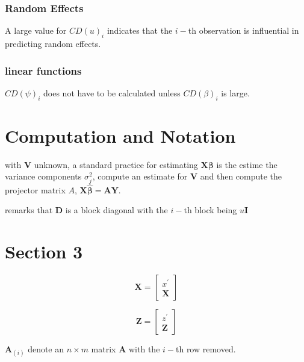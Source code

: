 \documentclass[12pt, a4paper]{article}
\begin{document}
\subsubsection{Random Effects}


A large value for $CD(u)_i$ indicates that the $i-$th observation is influential in predicting random effects.


\subsubsection{linear functions}


$CD(\psi)_i$ does not have to be calculated unless $CD(\beta)_i$ is large.



\section{Computation and Notation } %
with $\boldsymbol{V}$ unknown, a standard practice for estimating $\boldsymbol{X \beta}$ is the estime the variance components $\sigma^2_j$,
compute an estimate for $\boldsymbol{V}$ and then compute the projector matrix $A$, $\boldsymbol{X \hat{\beta}}  = \boldsymbol{AY}$.


\citet{tewomir} remarks that $\boldsymbol{D}$ is a block diagonal with the $i-$th block being $u \boldsymbol{I}$




\section{Section 3}

\[  \boldsymbol{X} = \left[  \begin{array}{c} x^{\prime} \\ \boldsymbol{X} \end{array} \right]   \]

\[  \boldsymbol{Z} = \left[  \begin{array}{c} z^{\prime} \\ \boldsymbol{Z} \end{array} \right]   \] 

$\boldsymbol{A}_{(i)}$ denote an $n\times m$ matrix $\boldsymbol{A}$ with the $i-$th row removed.

\end{document}
